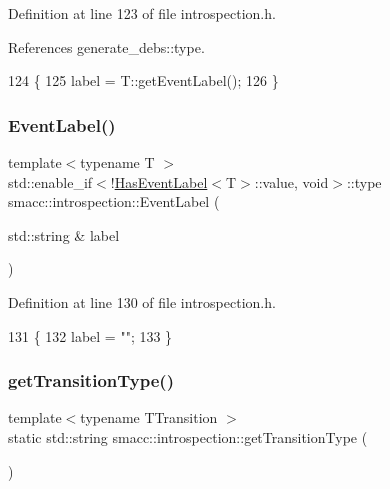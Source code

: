Definition at line 123 of file introspection.\+h.



References generate\+\_\+debs\+::type.


\begin{DoxyCode}
124 \{
125     label = T::getEventLabel();
126 \}
\end{DoxyCode}
\mbox{\label{namespacesmacc_1_1introspection_aaf610a608f1f29ab3827a80e052d0ebe}} 
\subsubsection{\texorpdfstring{Event\+Label()}{EventLabel()}\hspace{0.1cm}{\footnotesize\ttfamily [2/2]}}
{\footnotesize\ttfamily template$<$typename T $>$ \\
std\+::enable\+\_\+if$<$!\hyperlink{classsmacc_1_1introspection_1_1HasEventLabel}{Has\+Event\+Label}$<$T$>$\+::value, void$>$\+::type smacc\+::introspection\+::\+Event\+Label (\begin{DoxyParamCaption}\item[{std\+::string \&}]{label }\end{DoxyParamCaption})}



Definition at line 130 of file introspection.\+h.


\begin{DoxyCode}
131 \{
132     label = \textcolor{stringliteral}{""};
133 \}
\end{DoxyCode}
\mbox{\label{namespacesmacc_1_1introspection_a62b41b5a90e19f27288b1aaac317fef1}} 
\subsubsection{\texorpdfstring{get\+Transition\+Type()}{getTransitionType()}}
{\footnotesize\ttfamily template$<$typename T\+Transition $>$ \\
static std\+::string smacc\+::introspection\+::get\+Transition\+Type (\begin{DoxyParamCaption}{ }\end{DoxyParamCaption})\hspace{0.3cm}{\ttfamily [static]}}



